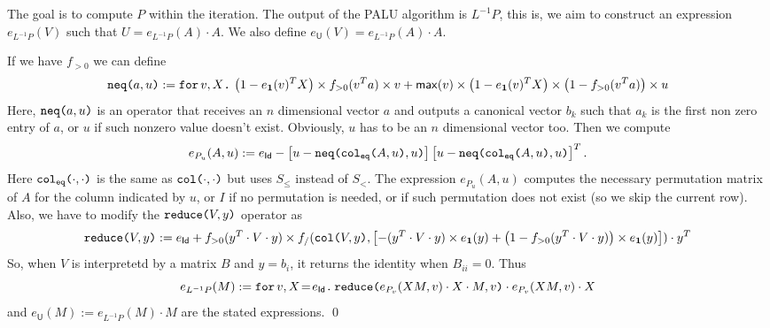 The goal is to compute $P$ within the iteration. The output of the PALU algorithm is $L^{-1}P$, this is, 
we aim to construct an expression $e_{L^{-1}P}(V)$ such that $U=e_{L^{-1}P}(A)\cdot A$. We also define 
$e_{\mathsf{U}}(V)=e_{L^{-1}P}(A)\cdot A$.

If we have $f_{>0}$ we can define 
$$
\nneq{a}{u}:=\ffor{v}{X}{\left( 1-e_{\ones}(v)^TX \right) \times f_{>0}(v^Ta)\times v + \mathsf{max}(v)\times\left( 1-e_{\ones}(v)^TX \right)\times \left( 1 - f_{>0}(v^Ta) \right) \times u}
$$
Here, $\nneq{a}{u}$ is an operator that receives an $n$ dimensional vector $a$ and outputs a 
canonical vector $b_k$ such that $a_k$ is the first non zero entry of $a$, or $u$ if such nonzero 
value doesn't exist. Obviously, $u$ has to be an $n$ dimensional vector too.
Then we compute 
$$
e_{P_u}(A,u) := e_{\mathsf{Id}} - \left[ u - \nneq{ \ccoleq{A}{u} }{u} \right]\left[ u - \nneq{ \ccoleq{A}{u} }{u} \right]^T.
$$ 
Here $\ccoleq{\cdot}{\cdot}$ is the same as $\ccol{\cdot}{\cdot}$ but uses $S_{\leq}$ instead of 
$S_{<}$. The expression $e_{P_u}(A,u)$ computes the necessary permutation matrix of $A$ for the column indicated by $u$, or $I$
if no permutation is needed, or if such permutation does not exist (so we skip the current row).
Also, we have to modify the $\red{V}{y}$ operator as 
$$
\red{V}{y}:= e_{\mathsf{Id}}+ f_{>0}(y^T\cdot V\cdot y)\times f_/(\ccol{V}{y},\left[ -(y^T\cdot V\cdot y)\times e_{\ones}(y) + \left( 1 - f_{>0}(y^T\cdot V\cdot y) \right)\times e_{\ones}(y) \right])\cdot y^T
$$
So, when $V$ is interpretetd by a  matrix $B$ and $y=b_i$, it returns the identity when $B_{ii}=0$.
Thus 
$$
e_{L^{-1}P}(M):=\initf{e_{\mathsf{Id}}}{v}{X}{\red{e_{P_v}(XM,v)\cdot X\cdot M}{v}\cdot e_{P_v}(XM,v)\cdot X}
$$
and $e_{\mathsf{U}}(M):=e_{L^{-1}P}(M)\cdot M$ are the stated expressions.
\qed


